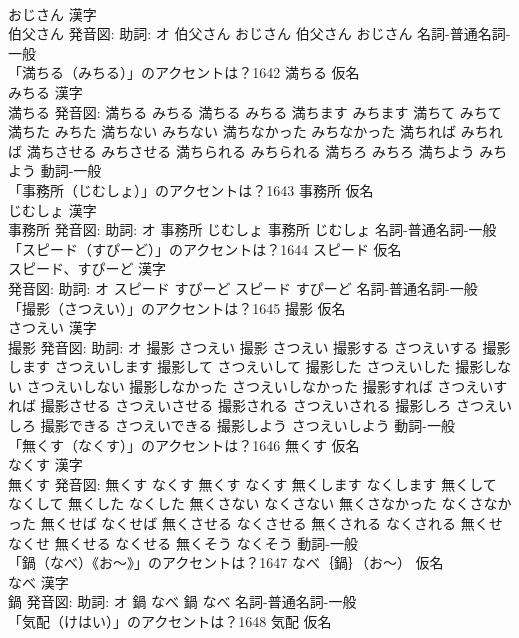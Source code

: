 \documentclass[8pt]{extreport}
\begin{document}
\begin{CJK}{UTF8}{min}
\\	おじさん 漢字　
\\	伯父さん 発音図: 助詞: オ	伯父さん おじさん		伯父さん おじさん				名詞-普通名詞-一般 
\\	「満ちる（みちる）」のアクセントは？1642	満ちる 仮名　
\\	みちる 漢字　
\\	満ちる 発音図:	満ちる みちる		満ちる みちる 満ちます みちます 満ちて みちて 満ちた みちた 満ちない みちない 満ちなかった みちなかった 満ちれば みちれば 満ちさせる みちさせる 満ちられる みちられる 満ちろ みちろ 満ちよう みちよう				動詞-一般 
\\	「事務所（じむしょ）」のアクセントは？1643	事務所 仮名　
\\	じむしょ 漢字　
\\	事務所 発音図: 助詞: オ	事務所 じむしょ		事務所 じむしょ				名詞-普通名詞-一般 
\\	「スピード（すぴーど）」のアクセントは？1644	スピード 仮名　
\\	スピード、すぴーど 漢字　
\\	発音図: 助詞: オ	スピード すぴーど		スピード すぴーど				名詞-普通名詞-一般 
\\	「撮影（さつえい）」のアクセントは？1645	撮影 仮名　
\\	さつえい 漢字　
\\	撮影 発音図: 助詞: オ	撮影 さつえい		撮影 さつえい 撮影する さつえいする 撮影します さつえいします 撮影して さつえいして 撮影した さつえいした 撮影しない さつえいしない 撮影しなかった さつえいしなかった 撮影すれば さつえいすれば 撮影させる さつえいさせる 撮影される さつえいされる 撮影しろ さつえいしろ 撮影できる さつえいできる 撮影しよう さつえいしよう				動詞-一般 
\\	「無くす（なくす）」のアクセントは？1646	無くす 仮名　
\\	なくす 漢字　
\\	無くす 発音図:	無くす なくす		無くす なくす 無くします なくします 無くして なくして 無くした なくした 無くさない なくさない 無くさなかった なくさなかった 無くせば なくせば 無くさせる なくさせる 無くされる なくされる 無くせ なくせ 無くせる なくせる 無くそう なくそう				動詞-一般 
\\	「鍋（なべ）《お〜》」のアクセントは？1647	なべ｛鍋｝（お〜） 仮名　
\\	なべ 漢字　
\\	鍋 発音図: 助詞: オ	鍋 なべ		鍋 なべ				名詞-普通名詞-一般 
\\	「気配（けはい）」のアクセントは？1648	気配 仮名　

\end{CJK}
\end{document}
